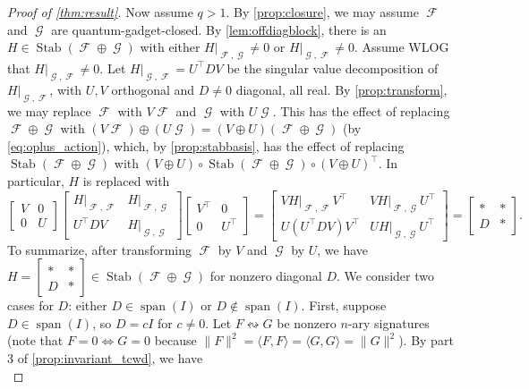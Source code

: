 \documentclass{article}
\theoremstyle{remark}
\theoremstyle{definition}
\DeclareMathOperator{\spn}{span}
\DeclareMathOperator{\fc}{\mathcal{F}}
\DeclareMathOperator{\gc}{\mathcal{G}}
\DeclareMathOperator{\stab}{Stab}
\begin{document}
\begin{proof}[Proof of \autoref{thm:result}]
    Now assume $q > 1$. By \autoref{prop:closure}, we may assume $\fc$ and $\gc$ are 
    quantum-gadget-closed. By \autoref{lem:offdiagblock}, there is an $H \in \stab(\fc\oplus\gc)$
    with either $H|_{\fc,\gc} \neq 0$ or $H|_{\gc,\fc} \neq 0$. Assume WLOG that $H|_{\gc,\fc} \neq 0$.
    Let $H|_{\gc,\fc} = U^\top D V$ be the singular value decomposition of $H|_{\gc,\fc}$, with
    $U,V$ orthogonal and $D \neq 0$ diagonal, all real. By \autoref{prop:transform}, we may replace $\fc$
    with $V \fc$ and $\gc$ with $U \gc$.
    This has the effect of replacing $\fc \oplus \gc$ with
    $(V\fc)\oplus (U \gc) = (V \oplus U)(\fc \oplus \gc)$ (by \eqref{eq:oplus_action}), which, by \autoref{prop:stabbasis}, has the effect of replacing 
    $\stab(\fc\oplus\gc)$ with $(V \oplus U) \circ \stab(\fc\oplus\gc) \circ (V \oplus U)^\top$. In particular, $H$ is replaced with
    \[
        \begin{bmatrix} V & 0 \\ 0 & U \end{bmatrix} 
        \begin{bmatrix} H|_{\fc,\fc} & H|_{\fc,\gc} \\ U^\top DV & H|_{\gc,\gc} \end{bmatrix}
        \begin{bmatrix} V^\top & 0 \\ 0 & U^\top \end{bmatrix} =
        \begin{bmatrix} VH|_{\fc,\fc}V^\top & VH|_{\fc,\gc}U^\top \\ U(U^\top DV) V^\top & U H|_{\gc,\gc} U^\top \end{bmatrix}
        = \begin{bmatrix} * & * \\ D & * \end{bmatrix}.
    \]
    To summarize, after transforming $\fc$ by $V$ and $\gc$ by $U$, we have
    $H = \begin{bmatrix} * & * \\ D & * \end{bmatrix} \in \stab(\fc \oplus \gc)$ for nonzero diagonal
    $D$. We consider two cases for $D$: either $D \in \spn(I)$ or $D \not\in \spn(I)$.
    First, suppose $D \in \spn(I)$, so $D = cI$ for $c \neq 0$. 
    Let $F \leftrightsquigarrow G$ be nonzero $n$-ary signatures (note that $F = 0 \iff G = 0$ because
    $\|F\|^2 = \langle F,F\rangle = \langle G,G\rangle = \|G\|^2$).
    By part 3 of \autoref{prop:invariant_tcwd}, we have 
    \begin{equation}

\end{equation}
\end{proof}
\end{document}
